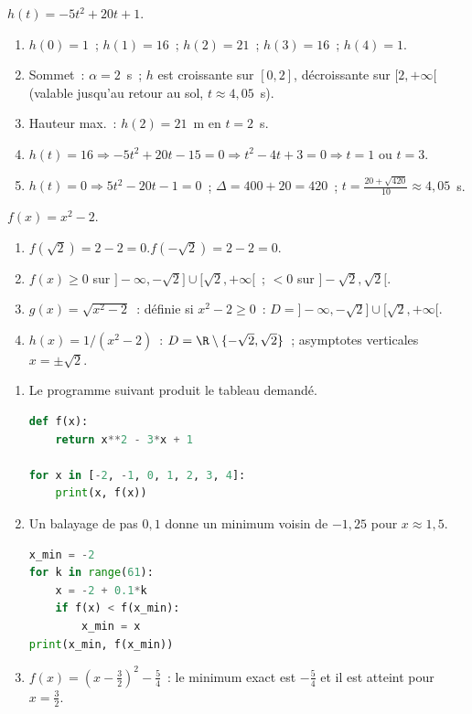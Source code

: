 
$h(t)=-5t^2+20t+1$.
\begin{enumerate}
  \item $h(0)=1$~; $h(1)=16$~; $h(2)=21$~; $h(3)=16$~; $h(4)=1$.
  \item Sommet~: $\alpha=2$~s~; $h$ est croissante sur $[0,2]$, d\'ecroissante sur $[2,+\infty[$ (valable jusqu'au retour au sol, $t\approx4{,}05$~s).
  \item Hauteur max.~: $h(2)=21$~m en $t=2$~s.
  \item $h(t)=16\Rightarrow-5t^2+20t-15=0\Rightarrow t^2-4t+3=0\Rightarrow t=1$ ou $t=3$.
  \item $h(t)=0\Rightarrow5t^2-20t-1=0$~; $\Delta=400+20=420$~; $t=\frac{20+\sqrt{420}}{10}\approx4{,}05$~s.
\end{enumerate}


$f(x)=x^2-2$.
\begin{enumerate}
  \item $f(\sqrt{2})=2-2=0$.\checkmark\quad $f(-\sqrt{2})=2-2=0$.\checkmark
  \item $f(x)\geq0$ sur $]-\infty,-\sqrt{2}]\cup[\sqrt{2},+\infty[$~; $<0$ sur $]-\sqrt{2},\sqrt{2}[$.
  \item $g(x)=\sqrt{x^2-2}$~: d\'efinie si $x^2-2\geq0$~: $D=]-\infty,-\sqrt{2}]\cup[\sqrt{2},+\infty[$.
  \item $h(x)=1/(x^2-2)$~: $D=\R\setminus\{-\sqrt{2},\sqrt{2}\}$~;
        asymptotes verticales $x=\pm\sqrt{2}$.
\end{enumerate}


\begin{enumerate}
  \item Le programme suivant produit le tableau demand\'e.
\begin{lstlisting}[language=Python]
def f(x):
    return x**2 - 3*x + 1

for x in [-2, -1, 0, 1, 2, 3, 4]:
    print(x, f(x))
\end{lstlisting}
  \item Un balayage de pas $0{,}1$ donne un minimum voisin de $-1{,}25$
        pour $x\approx1{,}5$.
\begin{lstlisting}[language=Python]
x_min = -2
for k in range(61):
    x = -2 + 0.1*k
    if f(x) < f(x_min):
        x_min = x
print(x_min, f(x_min))
\end{lstlisting}
  \item $f(x)=\left(x-\frac32\right)^2-\frac54$~: le minimum exact est
        $-\frac54$ et il est atteint pour $x=\frac32$.
\end{enumerate}

